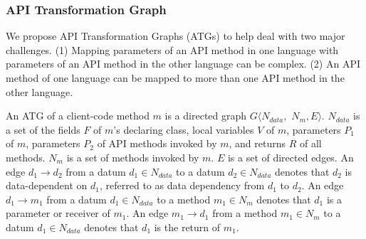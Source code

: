 \subsubsection{API Transformation Graph}

We propose API Transformation Graphs (ATGs) to help deal with two
major challenges. (1) Mapping parameters of an API method in one language with
parameters of an API method in the other language can be complex. (2) An API
method of one language can be mapped to more than one API method in the
other language.

An ATG of a client-code method $m$ is a directed graph $G\langle N_{data},$ $ N_m, E\rangle$.
$N_{data}$ is a set of the fields $F$ of $m$'s declaring class, local variables $V$ of
$m$, parameters $P_1$ of $m$, parameters $P_2$ of API methods invoked
by $m$, and returns $R$ of all methods. $N_{m}$ is a set of
methods invoked by $m$. $E$ is a set of directed edges. An edge
$d_1\rightarrow d_2$ from a datum $d_1 \in N_{data}$ to a datum $d_2
\in N_{data}$ denotes that $d_2$ is data-dependent on $d_1$, referred to as
data dependency from $d_1$ to $d_2$. An edge $d_1 \rightarrow m_1$ from a datum $d_1 \in N_{data}$ to a
method $ m_1 \in N_{m}$ denotes that $d_1$ is a parameter or receiver
of $m_1$. An edge $m_1 \rightarrow d_1$ from a method $m_1
\in N_{m}$ to a datum $d_1 \in N_{data}$ denotes that $d_1$ is the return
of $m_1$.

%
%
%

